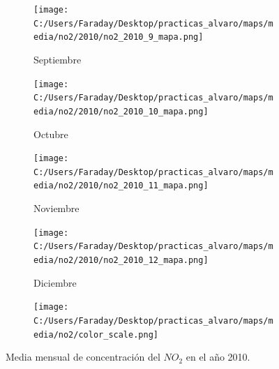 \documentclass[12pt]{beamer}
\begin{document}
\begin{frame}[squeeze]
\begin{figure}[H]
\begin{subfigure}[H]{0.20\textwidth}
\texttt{[image: C:/Users/Faraday/Desktop/practicas\_alvaro/maps/media/no2/2010/no2\_2010\_9\_mapa.png]}
\captionsetup{labelformat=empty}
\caption{\scriptsize Septiembre}
\label{fig:map-no2-2010-9}
\end{subfigure}
%
\begin{subfigure}[H]{0.20\textwidth}
\texttt{[image: C:/Users/Faraday/Desktop/practicas\_alvaro/maps/media/no2/2010/no2\_2010\_10\_mapa.png]}
\captionsetup{labelformat=empty}
\caption{\scriptsize Octubre}
\label{fig:map-no2-2010-10}
\end{subfigure}
%
\begin{subfigure}[H]{0.20\textwidth}
\texttt{[image: C:/Users/Faraday/Desktop/practicas\_alvaro/maps/media/no2/2010/no2\_2010\_11\_mapa.png]}
\captionsetup{labelformat=empty}
\caption{\scriptsize Noviembre}
\label{fig:map-no2-2010-11}
\end{subfigure}
%
\begin{subfigure}[H]{0.20\textwidth}
\texttt{[image: C:/Users/Faraday/Desktop/practicas\_alvaro/maps/media/no2/2010/no2\_2010\_12\_mapa.png]}
\captionsetup{labelformat=empty}
\caption{\scriptsize Diciembre}
\label{fig:map-no2-2010-12}
\end{subfigure}

\begin{subfigure}[H]{0.45\textwidth}
\texttt{[image: C:/Users/Faraday/Desktop/practicas\_alvaro/maps/media/no2/color\_scale.png]}
\captionsetup{labelformat=empty}
\caption{}
\end{subfigure}

\vspace*{-7mm}
\caption{\scriptsize Media mensual de concentración del $NO_{2}$ en el año 2010.}
\label{fig:map-no2-2010}
\end{figure}
\end{frame}
\end{document}

